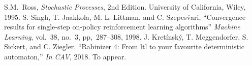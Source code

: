 \documentclass[letterpaper, 10 pt, conference]{ieeeconf}  %
\begin{document}
\begin{thebibliography}{99}
S.M.\ Ross,
\textit{Stochastic Processes}, 2nd Edition. University of California, Wiley, 1995.
S. Singh, T. Jaakkola, M. L. Littman, and C. Szepes\'{v}ari,
``Convergence results for single-step on-policy reinforcement learning algorithms'' \textit{Machine Learning},
vol.~38, no.~3, pp,~287--308, 1998.
J. Kretínsk\'{y}, T. Meggendorfer, S. Sickert, and C. Ziegler. ``Rabinizer 4: From ltl to
your favourite deterministic automaton,'' \textit{In CAV}, 2018. To appear.

\end{thebibliography}
\end{document}
